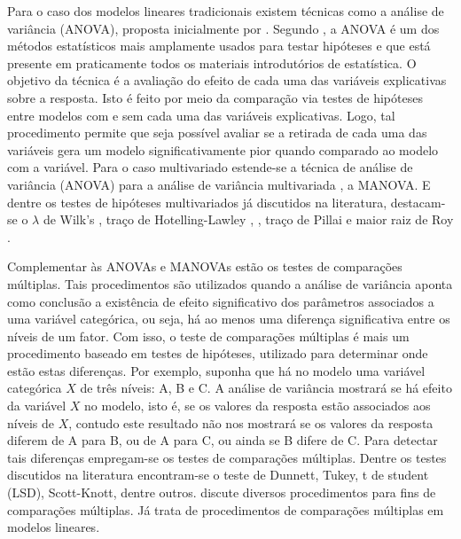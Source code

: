 Para o caso dos modelos lineares tradicionais existem técnicas como a análise de variância (ANOVA), proposta inicialmente por \citet{anova_fisher}. Segundo \citet{anova1}, a ANOVA é um dos métodos estatísticos mais amplamente usados para testar hipóteses e que está presente em praticamente todos os materiais introdutórios de estatística. O objetivo da técnica é a avaliação do efeito de cada uma das variáveis explicativas sobre a resposta. Isto é feito por meio da comparação via testes de hipóteses entre modelos com e sem cada uma das variáveis explicativas. Logo, tal procedimento permite que seja possível avaliar se a retirada de cada uma das variáveis gera um modelo significativamente pior quando comparado ao modelo com a variável. Para o caso multivariado estende-se a técnica de análise de variância (ANOVA) para a análise de variância  multivariada \citep{manova}, a MANOVA. E dentre os testes de hipóteses multivariados já discutidos na literatura, destacam-se o $\lambda$ de Wilk's \citep{wilks}, traço de Hotelling-Lawley \citep{lawley}, \citep{hotelling}, traço de Pillai \citep{pillai} e maior raiz de Roy \citep{roy}. 


Complementar às ANOVAs e MANOVAs estão os testes de comparações múltiplas. Tais procedimentos são utilizados quando a análise de variância aponta como conclusão a existência de efeito significativo dos parâmetros associados a uma variável categórica, ou seja, há ao menos uma diferença significativa entre os níveis de um fator. Com isso, o teste de comparações múltiplas é mais um procedimento baseado em testes de hipóteses, utilizado para determinar onde estão estas diferenças. Por exemplo, suponha que há no modelo uma variável categórica $X$ de três níveis: A, B e C. A análise de variância mostrará se há efeito da variável $X$ no modelo, isto é, se os valores da resposta estão associados aos níveis de $X$, contudo este resultado não nos mostrará se os valores da resposta diferem de A para B, ou de A para C, ou ainda se B difere de C. Para detectar tais diferenças empregam-se os testes de comparações múltiplas. Dentre os testes discutidos na literatura encontram-se o teste de Dunnett, Tukey, t de student (LSD), Scott-Knott, dentre outros. \citet{hsu1996multiple} discute diversos procedimentos para fins de comparações múltiplas. Já \citet{bretz2008multiple} trata de procedimentos de comparações múltiplas em modelos lineares.


